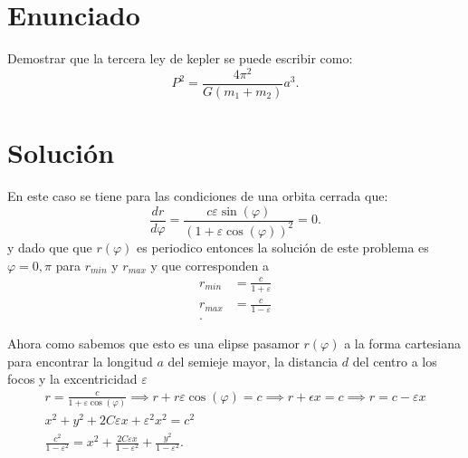 \documentclass{report}
\begin{document}
\section{Enunciado}

Demostrar que la tercera ley de kepler se puede escribir como: \[
P^2 = \frac{4\pi^2}{G\left( m_1 + m_2 \right) }a^{3}
.\]

\section{Solución}

En este caso se tiene para las condiciones de una orbita cerrada que: \[
\frac{dr}{d\varphi}=\frac{c\varepsilon\sin\left( \varphi \right) }{(1 + \varepsilon\cos\left( \varphi \right))^2 }=0
.\] y dado que que $r\left( \varphi \right) $ es periodico entonces la solución de este problema es $\varphi = 0, \pi$ para $r_{min}$ y $r_{max}$ y que corresponden a
\begin{align*}
  r_{min}&= \frac{c}{1+\varepsilon} \\
  r_{max}&= \frac{c}{1-\varepsilon} \\
.\end{align*}

Ahora como sabemos que esto es una elipse pasamor $r\left( \varphi \right) $ a la forma cartesiana para encontrar la longitud $a$ del semieje mayor, la distancia $d$ del centro a los focos y la excentricidad $\varepsilon$
\begin{align*}
  r = \frac{c}{1+\varepsilon\cos\left( \varphi \right) } \implies r + r\varepsilon\cos\left( \varphi \right)= c \implies r + \epsilon x = c \implies r = c - \varepsilon x \\
  x^2 + y^2 + 2C\varepsilon x + \varepsilon^2 x^2 = c^2\\
  \frac{c^2}{1-\varepsilon^2}=x^2 + \frac{2C\varepsilon x}{1 - \varepsilon^2} + \frac{y^2}{1-\varepsilon^2}
.\end{align*}
\end{document}
